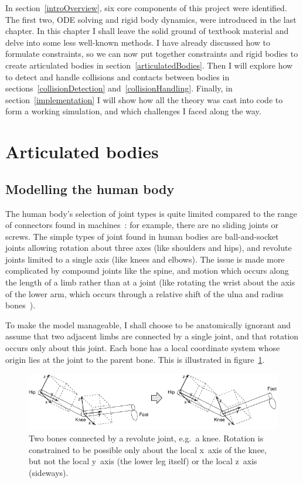 In section~\ref{introOverview}, six core components of this project were identified. The first
two, ODE solving and rigid body dynamics, were introduced in the last chapter. In this chapter
I shall leave the solid ground of textbook material and delve into some less well-known methods.
I have already discussed how to formulate constraints, so we can now put together constraints
and rigid bodies to create articulated bodies in section~\ref{articulatedBodies}. Then I will
explore how to detect and handle collisions and contacts between bodies in
sections~\ref{collisionDetection} and~\ref{collisionHandling}. Finally, in
section~\ref{implementation} I will show how all the theory was cast into code to form a
working simulation, and which challenges I faced along the way.


\section{Articulated bodies\label{articulatedBodies}}

\subsection{Modelling the human body}

The human body's selection of joint types is quite limited compared to the range of connectors
found in machines~\cite{Kalra:95}: for example, there are no sliding joints or screws. The simple
types of joint found in human bodies are ball-and-socket joints allowing rotation about three axes
(like shoulders and hips), and revolute joints limited to a single axis (like knees and elbows).
The issue is made more complicated by compound joints like the spine, and motion which occurs
along the length of a limb rather than at a joint (like rotating the wrist about the axis of
the lower arm, which occurs through a relative shift of the ulna and radius
bones~\cite{Anatomy:03}).

To make the model manageable, I shall choose to be anatomically ignorant and assume that two
adjacent limbs are connected by a single joint, and that rotation occurs only about this joint.
Each bone has a local coordinate system whose origin lies at the joint to the parent bone.
This is illustrated in figure~\ref{jointsFigure}.

\begin{figure}
\centerline{\includegraphics{figures/joint1}}
\caption{Two bones connected by a revolute joint, e.g.\ a knee. Rotation is constrained to be
    possible only about the local x~axis of the knee, but not the local y~axis
    (the lower leg itself) or the local z~axis (sideways).\label{jointsFigure}}
\end{figure}

